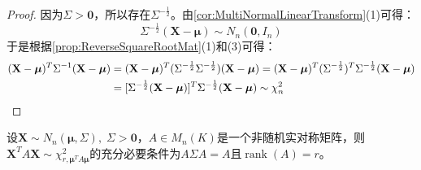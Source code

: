 \begin{proof}
	因为$\Sigma>\mathbf{0}$，所以存在$\Sigma^{-\frac{1}{2}}$。由\cref{cor:MultiNormalLinearTransform}(1)可得：
	\begin{equation*}
		\Sigma^{-\frac{1}{2}}(\mathbf{X}-\boldsymbol{\mu})\sim N_n(\mathbf{0},I_n)
	\end{equation*}
	于是根据\cref{prop:ReverseSquareRootMat}(1)和(3)可得：
	\begin{align*}
		(\mathbf{X}-\boldsymbol{\mu})^T\Sigma^{-1}(\mathbf{X}-\boldsymbol{\mu})&=(\mathbf{X}-\boldsymbol{\mu})^T(\Sigma^{-\frac{1}{2}}\Sigma^{-\frac{1}{2}})(\mathbf{X}-\boldsymbol{\mu}) =(\mathbf{X}-\boldsymbol{\mu})^T(\Sigma^{-\frac{1}{2}})^T\Sigma^{-\frac{1}{2}}(\mathbf{X}-\boldsymbol{\mu}) \\
		&=[\Sigma^{-\frac{1}{2}}(\mathbf{X}-\boldsymbol{\mu})]^T\Sigma^{-\frac{1}{2}}(\mathbf{X}-\boldsymbol{\mu})\sim\chi_n^2\qedhere
	\end{align*}
\end{proof}
\begin{theorem}\label{theo:XAXChi2}
	设$\mathbf{X}\sim N_n(\boldsymbol{\mu},\Sigma),\;\Sigma>\mathbf{0}$，$A\in M_{n}(K)$是一个非随机实对称矩阵，则$\mathbf{X}^TA\mathbf{X}\sim\chi_{r,\boldsymbol{\mu}^TA\boldsymbol{\mu}}^2$的充分必要条件为$A\Sigma A=A$且$\operatorname{rank}(A)=r$。
\end{theorem}
